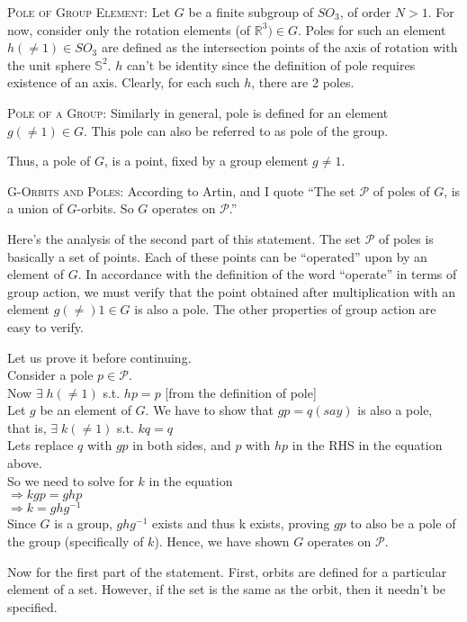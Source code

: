 \documentclass[12pt]{article}
\begin{document}
\textsc {Pole of Group Element: } Let $G$ be a finite subgroup of $SO_{3}$, of order $N > 1$. For now, consider only the rotation elements (of $\mathbb{R}^3) \in G$. Poles for such an element $h(\neq 1) \in SO_{3}$ are defined as the intersection points of the axis of rotation with the unit sphere $\mathbb{S}^2$. $h$ can't be identity since the definition of pole requires existence of an axis. Clearly, for each such $h$, there are 2 poles.
\par
\textsc {Pole of a Group: } Similarly in general, pole is defined for an element $g(\neq 1) \in G$. This pole can also be referred to as pole of the group.
\par
Thus, a pole of $G$, is a point, fixed by a group element $g \neq 1$.\\
\par
\textsc {G-Orbits and Poles: } According to Artin, and I quote ``The set $\mathcal P$ of poles of $G$, is a union of $G$-orbits. So $G$ operates on $\mathcal P$.''
\par
Here's the analysis of the second part of this statement. The set $\mathcal P$ of poles is basically a set of points. Each of these points can be ``operated'' upon by an element of $G$. In accordance with the definition of the word ``operate'' in terms of group action, we must verify that the point obtained after multiplication with an element $g(\neq) 1 \in G$ is also a pole. The other properties of group action are easy to verify.
\par
Let us prove it before continuing.\\ Consider a pole $p \in \mathcal P$.\\
Now $\exists\;h(\neq 1)$ s.t. $hp=p$ \hfill [from the definition of pole]\\
Let $g$ be an element of $G$. We have to show that $gp=q (say)$ is also a pole,\\
that is, $\exists\;k(\neq 1)$ s.t. $kq=q$\\
Lets replace $q$ with $gp$ in both sides, and $p$ with $hp$ in the RHS in the equation above.\\
So we need to solve for $k$ in the equation\\
$\Rightarrow kgp=ghp$\\
$\Rightarrow k=ghg^{-1}$\\
Since $G$ is a group, $ghg^{-1}$ exists and thus k exists, proving $gp$ to also be a pole of the group (specifically of $k$). Hence, we have shown $G$ operates on $\mathcal P$.
\par
Now for the first part of the statement. First, orbits are defined for a particular element of a set. However, if the set is the same as the orbit, then it needn't be specified.\\
\end{document}
